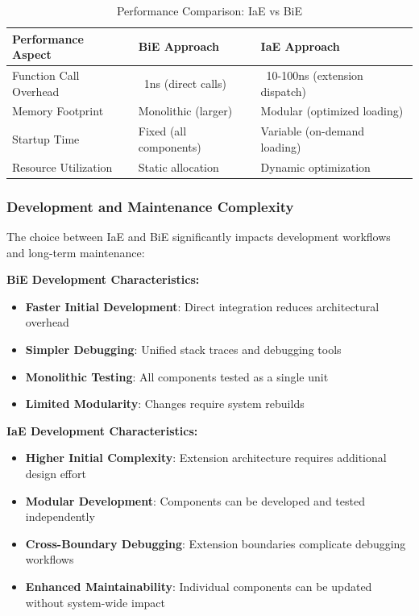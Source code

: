 \begin{table}[ht]
\centering
\begin{tabular}{@{}lll@{}}
\toprule
\textbf{Performance Aspect} & \textbf{BiE Approach} & \textbf{IaE Approach} \\
\midrule
Function Call Overhead & ~1ns (direct calls) & ~10-100ns (extension dispatch) \\
Memory Footprint & Monolithic (larger) & Modular (optimized loading) \\
Startup Time & Fixed (all components) & Variable (on-demand loading) \\
Resource Utilization & Static allocation & Dynamic optimization \\
\bottomrule
\end{tabular}
\caption{Performance Comparison: IaE vs BiE}
\label{tab:iae-bie-performance}
\end{table}

\subsubsection{Development and Maintenance Complexity}

The choice between IaE and BiE significantly impacts development workflows and long-term maintenance:

\textbf{BiE Development Characteristics:}
\begin{itemize}
    \item \textbf{Faster Initial Development}: Direct integration reduces architectural overhead
    \item \textbf{Simpler Debugging}: Unified stack traces and debugging tools
    \item \textbf{Monolithic Testing}: All components tested as a single unit
    \item \textbf{Limited Modularity}: Changes require system rebuilds
\end{itemize}

\textbf{IaE Development Characteristics:}
\begin{itemize}
    \item \textbf{Higher Initial Complexity}: Extension architecture requires additional design effort
    \item \textbf{Modular Development}: Components can be developed and tested independently
    \item \textbf{Cross-Boundary Debugging}: Extension boundaries complicate debugging workflows
    \item \textbf{Enhanced Maintainability}: Individual components can be updated without system-wide impact
\end{itemize}

